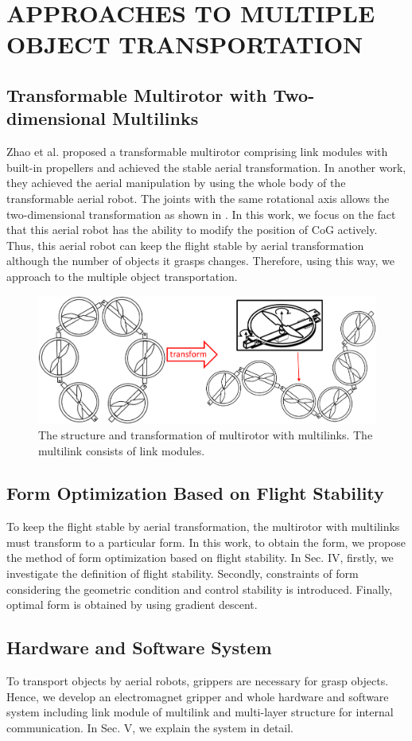 \section{APPROACHES TO MULTIPLE OBJECT TRANSPORTATION}
\subsection{Transformable Multirotor with Two-dimensional Multilinks}
Zhao et al.\cite{Zhao2016} proposed a transformable multirotor comprising link modules with built-in propellers and achieved the stable aerial transformation. In another work\cite{ZhaoICRA2017}, they achieved the aerial manipulation by using the whole body of the transformable aerial robot. The joints with the same rotational axis allows the two-dimensional transformation as shown in . In this work, we focus on the fact that this aerial robot has the ability to modify the position of CoG actively. Thus, this aerial robot can keep the flight stable by aerial transformation although the number of objects it grasps changes. Therefore, using this way, we approach to the multiple object transportation.
\begin{figure}[t]
  \begin{center}
    \includegraphics[width=1.0\columnwidth]{figs/multilink.pdf}
  \end{center}
  \caption{The structure and transformation of multirotor with multilinks. The multilink consists of link modules.\label{figure:multi_link}}
\end{figure}
 
\subsection{Form Optimization Based on Flight Stability}
To keep the flight stable by aerial transformation, the multirotor with multilinks must transform to a particular form. In this work, to obtain the form, we propose the method of form optimization based on flight stability. In Sec. IV, firstly, we investigate the definition of flight stability. Secondly, constraints of form considering the geometric condition and control stability is introduced. Finally, optimal form is obtained by using gradient descent.
  
\subsection{Hardware and Software System}
To transport objects by aerial robots, grippers are necessary for grasp objects. Hence, we develop an electromagnet gripper and whole hardware and software system including link module of multilink and multi-layer structure for internal communication. In Sec. V, we explain the system in detail.

